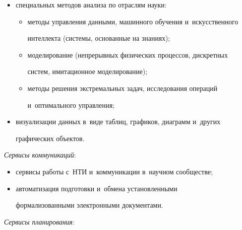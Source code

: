 \begin{itemize}
\begin{itemize}
\item расчет интегральных и~целевых показателей на графах;

\end{itemize}

\item специальных методов анализа по отраслям науки:\\[-13.5pt]

\begin{itemize}

\item методы управления данными, машинного обуче\-ния и~искусственного 

интеллекта (системы, основанные на знаниях);\\[-13.5pt]

\item моделирование (непрерывных физических процессов, дискретных 

систем, имитационное моделирование);\\[-13.5pt]

\item методы решения экстремальных задач, исследования операций 

и~оптимального управления;\\[-13.5pt]

\end{itemize}

\item визуализации данных в~виде таблиц, графиков, диаграмм и~других 

графических объектов. 

\end{itemize}



    \textit{Сервисы коммуникаций}:

    \begin{itemize}

\item сервисы работы с~НТИ и~коммуникации в~научном сообществе;\\[-13.5pt]

\item автоматизация подготовки и~обмена установленными 

формализованными электронными документами.

\end{itemize}



    \textit{Сервисы планирования}: 

